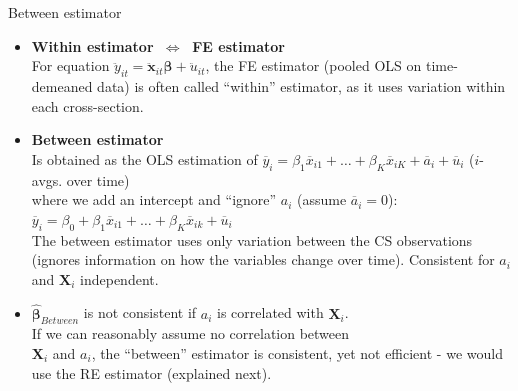 \documentclass[usenames,dvipsnames]{beamer}
\begin{document}
\begin{frame}{Between estimator}
\small
\begin{itemize}
\item \textbf{Within estimator $~\Longleftrightarrow~$ FE estimator}\\
For equation  $\ddot{y}_{it} = \bm{\ddot{x}}_{it} \bm{\beta} + \ddot{u}_{it}$, the FE estimator (pooled OLS on time-demeaned data) is often called ``within'' estimator, as it uses variation within each cross-section.
\bigskip
\item \textbf{Between estimator}\\
Is obtained as the OLS estimation of $\overline{y}_i = \beta_1 \overline{x}_{i1} + \dots + \beta_K \overline{x}_{iK} + \overline{a}_i + \overline{u}_i$ \qquad ($i$-avgs. over time) \\where we add an intercept and ``ignore'' $a_i$ (assume $\overline{a}_i=0$):\\ \medskip
$\overline{y}_i = \beta_0 + \beta_1 \overline{x}_{i1} + \dots + \beta_K \overline{x}_{ik} +  \overline{u}_i$
\medskip
\\The between estimator uses only variation between the CS observations (ignores information on how the variables change over time). Consistent for $a_i$ and $\bm{X}_i$ independent.\\
\bigskip
\item $\bm{\hat{\beta}}_{\textit{Between}}$ is not consistent if $a_i$ is correlated with $\bm{X}_i$. \\If we can reasonably assume no correlation between \\$\bm{X}_i$ and $a_i$, the ``between'' estimator is consistent, yet not efficient - we would use the RE estimator (explained next). 
\end{itemize}
\end{frame}
\end{document}
